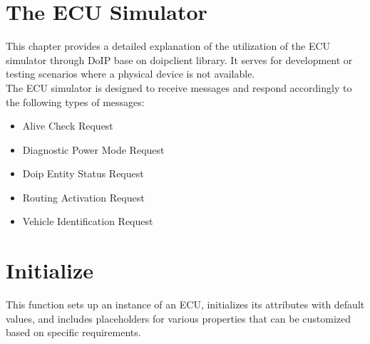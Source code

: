 




\section{The ECU Simulator}

This chapter provides a detailed explanation of the utilization of the ECU simulator through DoIP base on doipclient library. It serves for development or testing scenarios where a physical device is not available.
\\The ECU simulator is designed to receive messages and respond accordingly to the following types of messages:

\begin{itemize}
   \item Alive Check Request
   \item Diagnostic Power Mode Request
   \item Doip Entity Status Request
   \item Routing Activation Request
   \item Vehicle Identification Request
\end{itemize}

\section{Initialize}

This function sets up an instance of an ECU, initializes its attributes with default values, and includes placeholders for various properties that can be customized based on specific requirements.

